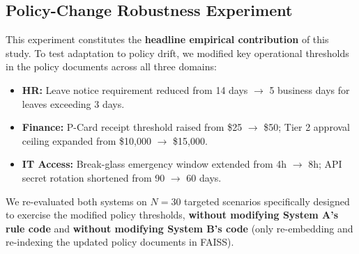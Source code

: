 \documentclass[sigconf,screen]{acmart}
\begin{document}
\subsection{Policy-Change Robustness Experiment}
\label{sec:robustness}
This experiment constitutes the \textbf{headline empirical contribution} of this study. To test adaptation to policy drift, we modified key operational thresholds in the policy documents across all three domains:
\begin{itemize}[leftmargin=*]
    \item \textbf{HR:} Leave notice requirement reduced from 14 days $\to$ 5 business days for leaves exceeding 3 days.
    \item \textbf{Finance:} P-Card receipt threshold raised from \$25 $\to$ \$50; Tier 2 approval ceiling expanded from \$10,000 $\to$ \$15,000.
    \item \textbf{IT Access:} Break-glass emergency window extended from 4h $\to$ 8h; API secret rotation shortened from 90 $\to$ 60 days.
\end{itemize}

We re-evaluated both systems on $N=30$ targeted scenarios specifically designed to exercise the modified policy thresholds, \textbf{without modifying System A's rule code} and \textbf{without modifying System B's code} (only re-embedding and re-indexing the updated policy documents in FAISS).

\begin{table}[t]
\centering
\footnotesize
\setlength{\tabcolsep}{3.5pt}
\renewcommand{\arraystretch}{1.15}
\caption{Policy-Change Robustness ($N=30$ Targeted Scenarios)}
\label{tab:robustness}
\end{table}
\end{document}
